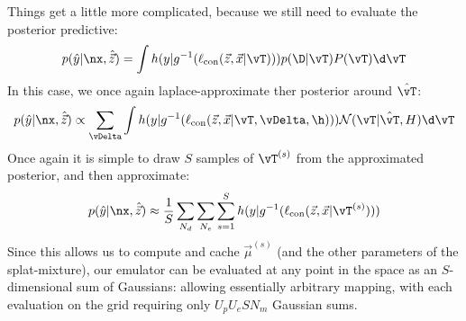         Things get a little more complicated, because we still need to evaluate the posterior predictive:
        \begin{equation}
            p(\hat{y} | \nx, \hat{\vec{z}}) = \int h(y | g^{-1}(\ell_\text{con}(\vec{z},\vec{x} | \vT))) p(\D | \vT) P(\vT) \d \vT
        \end{equation}
        In this case, we once again laplace-approximate ther posterior around $\hat{\vT}$:
         \begin{equation}
            p(\hat{y} | \nx, \hat{\vec{z}}) \propto \sum_\vDelta \int h(y | g^{-1}(\ell_\text{con}(\vec{z},\vec{x} | \vT,\vDelta,\h))) \mathcal{N}(\vT | \hat{\vT},H) \d \vT
        \end{equation}
        Once again it is simple to draw $S$ samples of $\vT^{(s)}$ from the approximated posterior, and then approximate:
        \begin{equation}
            p(\hat{y} | \nx, \hat{\vec{z}}) \approx \frac{1}{S} \sum_{N_d} \sum_{N_e}\sum_{s=1}^S  h(y | g^{-1}(\ell_\text{con}(\vec{z},\vec{x} | \vT^{(s)})))
        \end{equation}
        Since this allows us to compute and cache $\vec{\mu}^(s)$ (and the other parameters of the splat-mixture), our emulator can be evaluated at any point in the space as an $S$-dimensional sum of Gaussians: allowing essentially arbitrary mapping, with each evaluation on the grid requiring only $U_p U_e S N_m$ Gaussian sums.

